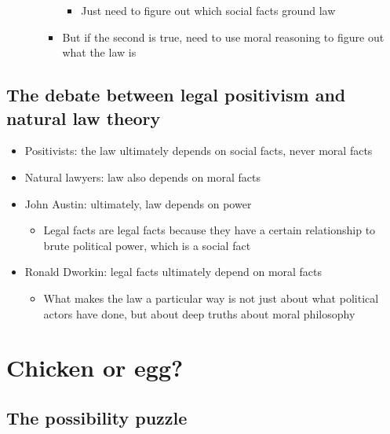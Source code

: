 \begin{itemize}
\begin{itemize}
\begin{itemize}
      \begin{itemize}
      \tightlist
      \item
        Just need to figure out which social facts ground law
      \end{itemize}
    \item
      But if the second is true, need to use moral reasoning to figure
      out what the law is
    \end{itemize}
  \end{itemize}
\end{itemize}

\hypertarget{the-debate-between-legal-positivism-and-natural-law-theory}{%
\subsection{The debate between legal positivism and natural law
theory}\label{the-debate-between-legal-positivism-and-natural-law-theory}}

\begin{itemize}
\tightlist
\item
  Positivists: the law ultimately depends on social facts, never moral
  facts
\item
  Natural lawyers: law also depends on moral facts
\item
  John Austin: ultimately, law depends on power

  \begin{itemize}
  \tightlist
  \item
    Legal facts are legal facts because they have a certain relationship
    to brute political power, which is a social fact
  \end{itemize}
\item
  Ronald Dworkin: legal facts ultimately depend on moral facts

  \begin{itemize}
  \tightlist
  \item
    What makes the law a particular way is not just about what political
    actors have done, but about deep truths about moral philosophy
  \end{itemize}
\end{itemize}

\hypertarget{chicken-or-egg}{%
\section{Chicken or egg?}\label{chicken-or-egg}}

\hypertarget{the-possibility-puzzle}{%
\subsection{The possibility puzzle}\label{the-possibility-puzzle}}

